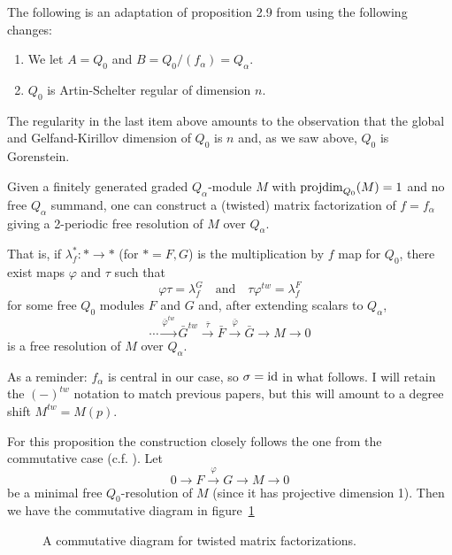 \documentclass [11pt, proquest] {uwthesis}[2020/02/24]
\begin{document}
    The following is an adaptation of proposition 2.9 from \cite{kirkman13} using the following changes:
    \begin{enumerate}
        \item We let $A=Q_0$ and $B=Q_0/(f_\alpha)=Q_\alpha.$
        \item $Q_0$ is Artin-Schelter regular of dimension $n$.
    \end{enumerate}
    The regularity in the last item above amounts to the observation that the global and Gelfand-Kirillov dimension of $Q_0$ is $n$ and, as we saw above, $Q_0$ is Gorenstein.
    \begin{prop}
        Given a finitely generated graded $Q_\alpha$-module $M$ with $\operatorname{projdim}_{Q_0}(M)=1$ and no free $Q_\alpha$ summand, one can construct a (twisted) matrix factorization of $f=f_\alpha$ giving a 2-periodic free resolution of $M$ over $Q_\alpha$. 
        
        That is, if $\lambda_f^*:\ast\to \ast$ (for $\ast=F,G$) is the multiplication by $f$ map for $Q_0$, there exist maps $\varphi$ and $\tau$ such that
        \[\varphi\tau = \lambda_f^G\quad\text{and}\quad \tau\varphi^{tw}=\lambda_f^F\]
        for some free $Q_0$ modules $F$ and $G$ and, after extending scalars to $Q_\alpha$,
        \[\cdots\xrightarrow{\bar\varphi^{tw}}\bar G^{tw}\xrightarrow{\bar\tau} \bar F\xrightarrow{\bar\varphi} \bar G\to M\to 0\]
        is a free resolution of $M$ over $Q_\alpha.$
    \end{prop}
    
    \begin{rmk}
    As a reminder: $f_\alpha$ is central in our case, so $\sigma=\operatorname{id}$ in what follows. I will retain the $(-)^{tw}$ notation to match previous papers, but this will amount to a degree shift $M^{tw}=M(p).$
    \end{rmk}
    
    For this proposition the construction closely follows the one from the commutative case (c.f. \cite{yoshino90}). Let
    \[0\to F\xrightarrow{\varphi}G\to M\to 0\]
    be a minimal free $Q_0$-resolution of $M$ (since it has projective dimension 1). Then we have the commutative diagram in figure~\ref{fig:factorization-diagram}
    \begin{figure}[ht!]
        \centering
        \caption{A commutative diagram for twisted matrix factorizations.}
        \label{fig:factorization-diagram}
    \end{figure}
    
\end{document}
